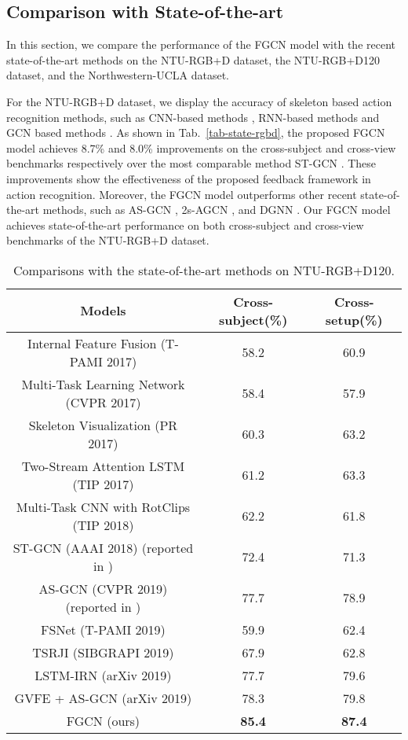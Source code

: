 \documentclass[runningheads]{llncs}
\begin{document}
\subsection{Comparison with State-of-the-art}

In this section, we compare the performance of the FGCN model with the recent state-of-the-art methods on the NTU-RGB+D dataset, the NTU-RGB+D120 dataset, and the Northwestern-UCLA dataset.

For the NTU-RGB+D dataset, we display the accuracy of skeleton based action recognition methods, such as CNN-based methods \cite{li2017skeleton}, RNN-based methods \cite{si2018skeleton,si2019attention,zhao2019bayesian} and GCN based methods \cite{li2019actional,shi2019skeleton,shi2019two,yan2018spatial}. As shown in Tab.~\ref{tab-state-rgbd}, the proposed FGCN model achieves 8.7\% and 8.0\% improvements on the cross-subject and cross-view benchmarks respectively over the most comparable method ST-GCN \cite{yan2018spatial}. These improvements show the effectiveness of the proposed feedback framework in action recognition. Moreover, the FGCN model outperforms other recent state-of-the-art methods, such as AS-GCN \cite{si2019attention}, 2s-AGCN \cite{shi2019two}, and DGNN \cite{shi2019skeleton}. Our FGCN model achieves state-of-the-art performance on both cross-subject and cross-view benchmarks of the NTU-RGB+D dataset.

\begin{table}[b]
	\caption{Comparisons with the state-of-the-art methods on NTU-RGB+D120.}
	\label{tab-state-rgbd120}
	\tabcolsep=4pt
	\centering
	\begin{tabular}{ccc}
		\hline
		Models & Cross-subject(\%) & Cross-setup(\%) \\
		\hline		
		Internal Feature Fusion (T-PAMI 2017) \cite{liu2017skeleton}	&58.2	&60.9 \\
		Multi-Task Learning Network (CVPR 2017) \cite{ke2017new}	&58.4	&57.9 \\
		Skeleton Visualization (PR 2017) \cite{liu2017enhanced}	&60.3	&63.2\\
		Two-Stream Attention LSTM (TIP 2017) \cite{liu2017skeleton-tip} 	&61.2	&63.3 \\
		Multi-Task CNN with RotClips (TIP 2018) \cite{ke2018learning}	&62.2	&61.8 \\
		ST-GCN (AAAI 2018) (reported in \cite{papadopoulos2019vertex})	&72.4 & 71.3	\\
		AS-GCN (CVPR 2019) (reported in \cite{papadopoulos2019vertex}) &77.7 & 78.9 \\
		FSNet (T-PAMI 2019) \cite{liu2019skeleton}	&59.9	&62.4 \\
		TSRJI (SIBGRAPI 2019) \cite{caetano2019skeleton} &67.9	&62.8  \\
		LSTM-IRN (arXiv 2019) \cite{perez2019interaction}	&77.7	&79.6  \\
		GVFE + AS-GCN (arXiv 2019) \cite{papadopoulos2019vertex}	&78.3	&79.8 \\
		\hline
		FGCN (ours)	&\textbf{85.4}	&\textbf{87.4} \\
		\hline
	\end{tabular}
\end{table}
\end{document}
